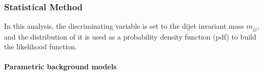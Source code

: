 \subsubsection{Statistical Method} 

In this analysis, the discriminating variable is set to the dijet invariant mass $m_{jj}$, and the distribution of it is used as  a probability density function (pdf) to build the likelihood function.

\paragraph{Parametric background models\\}



